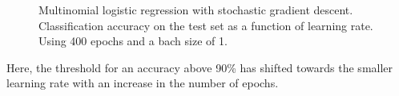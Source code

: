 \documentclass[11pt,a4paper,titlepage]{article}
\begin{document}
\begin{figure}[H]
\centering
{}
\caption[Classification accuracy to learning rate (Softmax Regression)]{Multinomial logistic regression with stochastic gradient descent. Classification accuracy on the test set as a function of learning rate. Using 400 epochs and a bach size of 1.}\label{Acc_to_LR_2}
\end{figure}
Here, the threshold for an accuracy above 90\% has shifted towards the smaller learning rate with an increase in the number of epochs.
\end{document}
